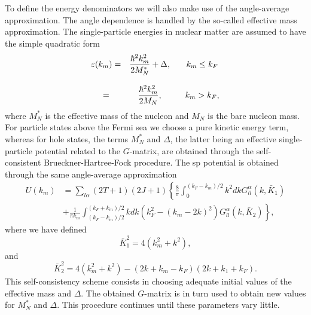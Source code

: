 \documentclass[%
oneside,                 %
final,                   %
10pt]{article}
\begin{document}
To define the energy denominators we will also make use of the
angle-average approximation.
The angle dependence is handled by the
so-called effective mass approximation. The single-particle energies
in nuclear matter are assumed to have the simple quadratic form
\begin{equation}
   \begin{array}{ccc}
   \varepsilon (k_m)=&
   {\displaystyle\frac{\hbar^{2}k_m^2}
   {2M_{N}^{*}}}+\Delta ,&\hspace{3mm}k_m\leq k_F\\
   &&\\
   =&{\displaystyle\frac{\hbar^{2}
   k_m^2}{2M_{N}}},&\hspace{3mm}k_m> k_F ,\\
   \end{array}
   \label{eq:spen}
\end{equation}
where $M_{N}^{*}$ is the effective mass of the nucleon and $M_{N}$ is the
bare nucleon mass. For particle states above the Fermi sea we choose
a pure kinetic energy term, whereas for hole states,
the terms $M_{N}^{*}$ and $\Delta$, the latter being 
an effective single-particle
potential related to the $G$-matrix, are obtained through the
self-consistent Brueckner-Hartree-Fock procedure.
The sp potential is obtained through the same angle-average approximation
\begin{align}
  \label{eq:Uav}
   U(k_m) & =\sum_{l\alpha} (2T+1)(2J+1)
   \left \{ \frac{8}{\pi}\int_{0}^{(k_F-k_m)/2}
   k^2dk G_{ll}^{\alpha}(k,\bar{K}_1) \right.  \\
   &    \left.
    + \frac{1}{\pi k_m}\int_{(k_F-k_m)/2}^{(k_F+k_m)/2}
   kdk (k_F ^2-(k_m-2k)^2)
   G_{ll}^{\alpha}(k,\bar{K}_2)  \right \}  \nonumber,
\end{align}
where we have defined
\begin{equation}
    \bar{K}_1^2=4(k_m^2+k^2),
\end{equation}
and
\begin{equation}
    \bar{K}_2^2=4(k_m^2+k^2)-(2k+k_m-k_F)(2k+k_1+k_F).
\end{equation}
This
self-consistency scheme consists in choosing adequate initial values of the
effective mass and $\Delta$. The obtained $G$-matrix is in turn used to
obtain new values for $M_{N}^{*}$ and $\Delta$. This procedure
continues until these parameters vary little.







\printindex
\end{document}
